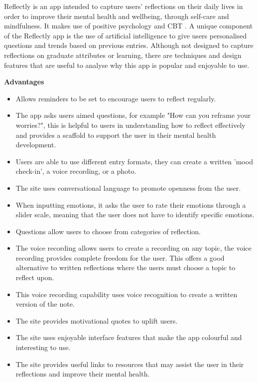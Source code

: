 \documentclass{l4proj}
\begin{document}
Reflectly is an app intended to capture users’ reflections on their daily lives in order to improve their mental health and wellbeing, through self-care and mindfulness. It makes use of positive psychology and CBT \citep{reflectly_app}. A unique component of the Reflectly app is the use of artificial intelligence to give users personalised questions and trends based on previous entries. Although not designed to capture reflections on graduate attributes or learning, there are techniques and design features that are useful to analyse why this app is popular and enjoyable to use. 

\textbf{Advantages}
\begin{itemize}
    \item Allows reminders to be set to encourage users to reflect regularly.
    \item The app asks users aimed questions, for example "How can you reframe your worries?", this is helpful to users in understanding how to reflect effectively and provides a scaffold to support the user in their mental health development.
    \item Users are able to use different entry formats, they can create a written 'mood check-in', a voice recording, or a photo.
    \item The site uses conversational language to promote openness from the user.
    \item When inputting emotions, it asks the user to rate their emotions through a slider scale, meaning that the user does not have to identify specific emotions. 
    \item Questions allow users to choose from categories of reflection.
    \item The voice recording allows users to create a recording on any topic, the voice recording provides complete freedom for the user. This offers a good alternative to written reflections where the users must choose a topic to reflect upon.
    \item This voice recording capability uses voice recognition to create a written version of the note.
    \item The site provides motivational quotes to uplift users.
    \item The site uses enjoyable interface features that make the app colourful and interesting to use.
    \item The site provides useful links to resources that may assist the user in their reflections and improve their mental health.
\end{itemize}
\end{document}

